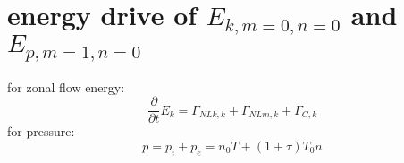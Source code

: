 \documentclass[11pt,a4paper]{article}
\begin{document}
%
%
%
%
%
%
%
%
%
%
%
%
%
%
\section{energy drive of $E_{k,m=0,n=0}$ and $E_{p,m=1,n=0}$}

for zonal flow energy:
\begin{equation}
\frac{\partial}{\partial{t}}E_k=\Gamma_{NLk,k}+\Gamma_{NLm,k}+\Gamma_{C,k}
\end{equation}
for pressure:
\begin{equation}
	p=p_i+p_e=n_0T+(1+\tau)T_0{n}
\end{equation}
\end{document}

